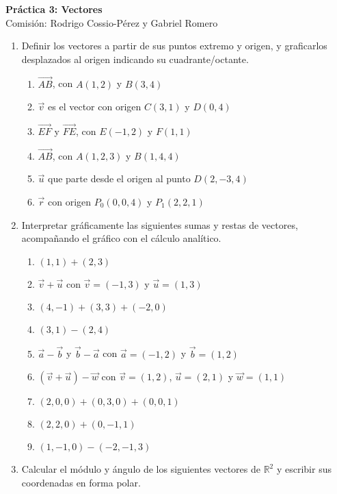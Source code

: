 \documentclass[a4paper]{article}
\newcommand{\exercise}{\item}
\newcommand{\vect}[1]{\overrightarrow{#1}}
\begin{document}
\noindent \hrulefill 
\vspace{-7pt}
\begin{center} 
	\textbf{ Práctica 3: Vectores } \\
	Comisión: Rodrigo Cossio-Pérez y Gabriel Romero
\end{center}
\vspace{-10pt}
\hrulefill
\begin{enumerate}
	\exercise Definir los vectores a partir de sus puntos extremo y origen, y graficarlos desplazados al origen indicando su cuadrante/octante.
	\begin{multicols}{2}
	\begin{enumerate} [label=(\alph*)]
		\item $\vect{AB}$, con $A(1,2)$ y $B(3,4)$
		\item $\vec{v}$ es el vector con origen $C(3,1)$ y $D(0,4)$
		\item $\vect{EF}$ y $\vect{FE}$, con $E(-1,2)$ y $F(1,1)$
		\item $\vect{AB}$, con $A(1,2,3)$ y $B(1,4,4)$
		\item $\vec{u}$ que parte desde el origen al punto $D(2,-3,4)$
		\item $\vec{r}$ con origen $P_0(0,0,4)$ y $P_1(2,2,1)$
	\end{enumerate}
	\end{multicols}
	\exercise Interpretar gráficamente las siguientes sumas y restas de vectores, acompañando el gráfico con el cálculo analítico.
	\begin{multicols}{2}
	\begin{enumerate} [label=(\alph*)]
		\item $(1,1)+(2,3)$
		\item $\vec{v} + \vec{u}$ con $\vec{v}=(-1,3)$ y $\vec{u}=(1,3)$
		\item $(4,-1)+(3,3)+(-2,0)$
		\item $(3,1)-(2,4)$
		\item $\vec{a} - \vec{b}$ y $\vec{b} - \vec{a}$ con $\vec{a}=(-1,2)$ y $\vec{b}=(1,2)$
		\item $\left(\vec{v}+\vec{u}\right)-\vec{w}$ con $\vec{v}=(1,2)$, $\vec{u}=(2,1)$ y $\vec{w}=(1,1)$
		\item $(2,0,0)+(0,3,0)+(0,0,1)$
		\item $(2,2,0)+(0,-1,1)$
		\item $(1,-1,0)-(-2,-1,3)$
	\end{enumerate}
	\end{multicols}
	\exercise Calcular el módulo y ángulo de los siguientes vectores de $\mathbb{R}^2$ y escribir sus coordenadas en forma polar.

\end{enumerate}
\end{document}
